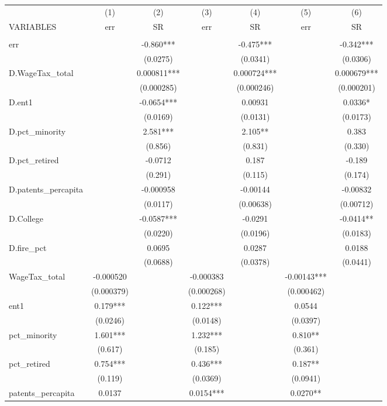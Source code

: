 \begin{tabular}{lcccccc} \hline
 & (1) & (2) & (3) & (4) & (5) & (6) \\
VARIABLES & err & SR & err & SR & err & SR \\ \hline
 &  &  &  &  &  &  \\
err &  & -0.860*** &  & -0.475*** &  & -0.342*** \\
 &  & (0.0275) &  & (0.0341) &  & (0.0306) \\
D.WageTax\_total &  & 0.000811*** &  & 0.000724*** &  & 0.000679*** \\
 &  & (0.000285) &  & (0.000246) &  & (0.000201) \\
D.ent1 &  & -0.0654*** &  & 0.00931 &  & 0.0336* \\
 &  & (0.0169) &  & (0.0131) &  & (0.0173) \\
D.pct\_minority &  & 2.581*** &  & 2.105** &  & 0.383 \\
 &  & (0.856) &  & (0.831) &  & (0.330) \\
D.pct\_retired &  & -0.0712 &  & 0.187 &  & -0.189 \\
 &  & (0.291) &  & (0.115) &  & (0.174) \\
D.patents\_percapita &  & -0.000958 &  & -0.00144 &  & -0.00832 \\
 &  & (0.0117) &  & (0.00638) &  & (0.00712) \\
D.College &  & -0.0587*** &  & -0.0291 &  & -0.0414** \\
 &  & (0.0220) &  & (0.0196) &  & (0.0183) \\
D.fire\_pct &  & 0.0695 &  & 0.0287 &  & 0.0188 \\
 &  & (0.0688) &  & (0.0378) &  & (0.0441) \\
WageTax\_total & -0.000520 &  & -0.000383 &  & -0.00143*** &  \\
 & (0.000379) &  & (0.000268) &  & (0.000462) &  \\
ent1 & 0.179*** &  & 0.122*** &  & 0.0544 &  \\
 & (0.0246) &  & (0.0148) &  & (0.0397) &  \\
pct\_minority & 1.601*** &  & 1.232*** &  & 0.810** &  \\
 & (0.617) &  & (0.185) &  & (0.361) &  \\
pct\_retired & 0.754*** &  & 0.436*** &  & 0.187** &  \\
 & (0.119) &  & (0.0369) &  & (0.0941) &  \\
patents\_percapita & 0.0137 &  & 0.0154*** &  & 0.0270** &  \\

\end{tabular}
